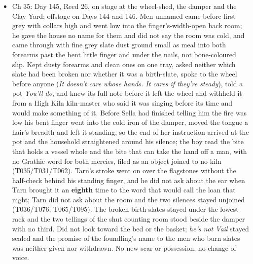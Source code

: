 \documentclass{design/chronicle}
\begin{document}
{\begin{itemize}[leftmargin=1.4em,itemsep=1pt,topsep=3pt,parsep=0pt]
\item Ch 35: Day 145, Reed 26, on stage at the wheel-shed, the damper and the Clay Yard; offstage on Days 144 and 146. Men unnamed came before first grey with collars high and went low into the finger’s-width-open back room; he gave the house no name for them and did not say the room was cold, and came through with fine grey slate dust ground small as meal into both forearms past the bent little finger and under the nails, not bone-coloured slip. Kept dusty forearms and clean ones on one tray, asked neither which slate had been broken nor whether it was a birth-slate, spoke to the wheel before anyone (\emph{It doesn’t care whose hands. It cares if they’re steady}), told a pot \emph{You’ll do}, and knew its full note before it left the wheel and withheld it from a High Kiln kiln-master who said it was singing before its time and would make something of it. Before Sella had finished telling him the fire was low his bent finger went into the cold iron of the damper, moved the tongue a hair’s breadth and left it standing, so the end of her instruction arrived at the pot and the household straightened around his silence; the boy read the bite that holds a vessel whole and the bite that can take the hand off a man, with no Grathic word for both mercies, filed as an object joined to no kiln (T035/T031/T062). Tarn’s stroke went on over the flagstones without the half-check behind his standing finger, and he did not ask about the ear when Tarn brought it an \textbf{eighth} time to the word that would call the loan that night; Tarn did not ask about the room and the two silences stayed unjoined (T036/T076, T065/T095). The broken birth-slates stayed under the lowest rack and the two tellings of the shut counting room stood beside the damper with no third. Did not look toward the bed or the basket; \emph{he’s not Vail} stayed sealed and the promise of the foundling’s name to the men who burn slates was neither given nor withdrawn. No new scar or possession, no change of voice.

\end{itemize}

\begin{itemize}[leftmargin=1.4em,itemsep=1pt,topsep=3pt,parsep=0pt]


\end{itemize}}
\end{document}
